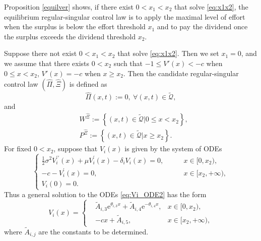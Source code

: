 \documentclass[11pt,reqno]{article}%
\numberwithin{equation}{section}
\begin{document}
Proposition \ref{equilver} shows, if there exist  $0 < x_1 < x_2$ that solve \eqref{eq:x1x2},  the equilibrium regular-singular control law is to apply the maximal level of effort when the surplus is below the effort threshold $x_1$ and to pay the dividend once the surplus exceeds the dividend threshold $x_2$.

Suppose there not exist  $0 < x_1 < x_2$  that solve \eqref{eq:x1x2}. Then we set $x_1=0$, and we assume that there exists $ 0< x_2$ such that $-1\le V'(x) < -c$ when $0\le x < x_2$, $V'(x) =-c$ when $x\ge x_2$. Then the candidate regular-singular control law $\left(\hat\Pi,\hat\Xi\right)$ is defined as 
\begin{equation}\label{hatpideg}
\hat \Pi(x,t) := 0,\ \forall (x,t)\in\mathcal{\tilde{Q}},
\end{equation}
and
\begin{equation}
\begin{aligned}
&W^{\hat{\Xi}}:=\left\{(x,t)\in\mathcal{\tilde{Q}}|0\leq x< x_2\right\},\\
&P^{\hat{\Xi}}:=\left\{(x,t)\in\mathcal{\tilde{Q}}|x\ge x_2\right\}.
\end{aligned}\label{hatxideg}
\end{equation}
For fixed $0< x_2$, suppose that $V_i(x)$ is given by the system of ODEs
\begin{equation}\label{eq:Vi_ODE2}
\begin{cases}
\frac{1}{2} \sigma^2 V^{\prime\prime}_i(x) + \mu V^\prime_i(x) - \delta_i V_i(x) = 0, \qquad & x \in [0, x_2),\\
-c- V^\prime_i(x) = 0, & x \in [x_2, +\infty),\\
V_i(0)=0.
\end{cases}
\end{equation}
Thus a general solution to the ODEs \eqref{eq:Vi_ODE2} has the form
\begin{equation}\label{Videg}
V_i(x) = \left\{\begin{aligned}
& \tilde{A}_{i,3} \mathrm{e}^{\theta_{i,3} x} + \tilde{A}_{i,4} \mathrm{e}^{-\theta_{i,4}x}, & x \in [0, x_2),\\
& -cx + \tilde{A}_{i,5}, \qquad & x \in [x_2, +\infty),
\end{aligned}\right.
\end{equation}
where $\tilde{A}_{i,j}$ are the constants to be determined.
\end{document}
